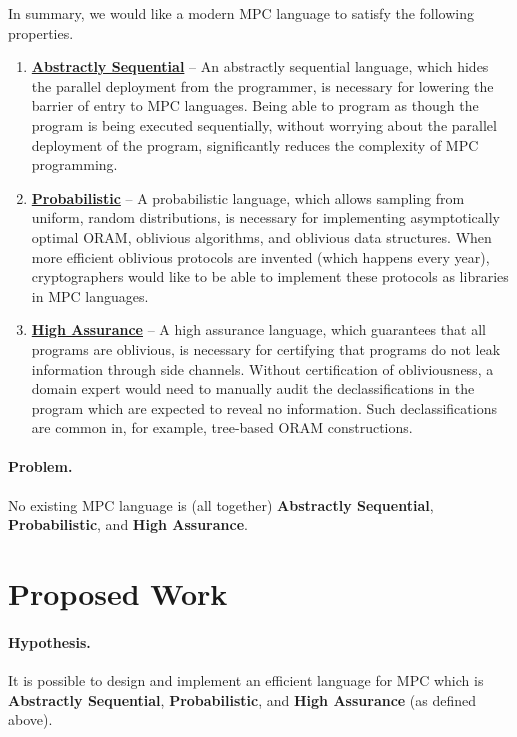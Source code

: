 In summary, we would like a modern MPC language to satisfy the following properties.

\begin{enumerate}
\item \label{itm:sequential} \textbf{\underline{Abstractly Sequential}} -- An abstractly sequential language, which hides the parallel deployment from the
  programmer, is necessary for lowering the barrier of entry to MPC languages. Being able to program as though the program is being executed sequentially,
  without worrying about the parallel deployment of the program, significantly reduces the complexity of MPC programming.
\item \label{itm:probabilistic} \textbf{\underline{Probabilistic}} -- A probabilistic language, which allows sampling from uniform, random distributions,
  is necessary for implementing asymptotically optimal ORAM, oblivious algorithms, and oblivious data structures. When more efficient oblivious protocols are
  invented (which happens every year), cryptographers would like to be able to implement these protocols as libraries in MPC languages.
\item \label{itm:assurance} \textbf{\underline{High Assurance}} -- A high assurance language, which guarantees that all programs are oblivious, is necessary
  for certifying that programs do not leak information through side channels. Without certification of obliviousness, a domain expert
  would need to manually audit the declassifications in the program which are expected to reveal no information. Such declassifications
  are common in, for example, tree-based ORAM constructions.
\end{enumerate}

\paragraph{Problem.} No existing MPC language is (all together) \textbf{Abstractly Sequential}, \textbf{Probabilistic}, and \textbf{High Assurance}.

\section{Proposed Work}
\label{sec:intro-proposal}

\paragraph{Hypothesis.} It is possible to design and implement an efficient language for MPC which is \textbf{Abstractly Sequential},
\textbf{Probabilistic}, and \textbf{High Assurance} (as defined above).

